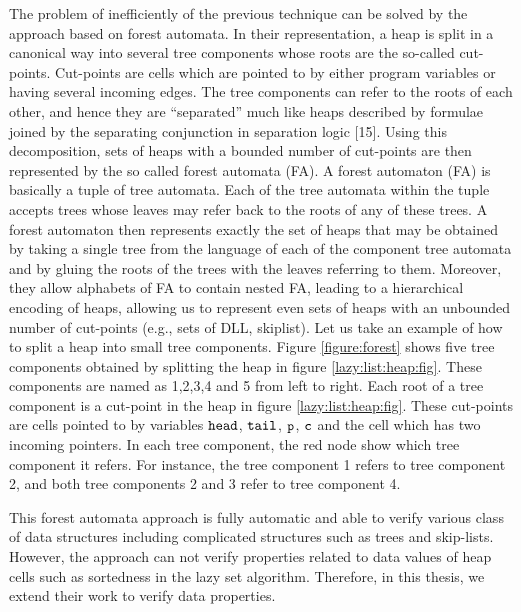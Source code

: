 The problem of inefficiently of the previous technique can be solved by the approach based on forest automata. In their representation, a heap is split in a canonical way into several tree components whose roots are the so-called cut-points. Cut-points are cells which are pointed to by either program variables or having several incoming edges. The tree components can refer to the roots of each other, and hence they are “separated” much like heaps described by formulae joined by the separating conjunction in separation logic [15]. Using this decomposition, sets of heaps with a bounded number of cut-points are then represented by the so called forest automata (FA). A forest automaton (FA) is basically a tuple of tree automata. Each of the tree
automata within the tuple accepts trees whose leaves may refer back to the
roots of any of these trees. A forest automaton then represents exactly the set
of heaps that may be obtained by taking a single tree from the language of each
of the component tree automata and by gluing the roots of the trees with the
leaves referring to them. Moreover, they allow alphabets of FA to contain nested FA, leading to a hierarchical encoding of heaps, allowing us to represent even sets of heaps with an unbounded number of cut-points (e.g., sets of DLL, skiplist). 
Let us take an example of how to split a heap into small tree components. Figure \ref{figure:forest} shows five tree components obtained by splitting the heap in figure \ref{lazy:list:heap:fig}. These components are named as 1,2,3,4 and 5 from left to right. Each root of a tree component is a cut-point in the heap in figure \ref{lazy:list:heap:fig}. These cut-points are cells pointed to by variables $\tt head$, $\tt tail$,  $\tt p$,  $\tt c$ and the cell which has two incoming pointers. In each tree component, the red node show which  tree component it refers. For instance, the tree component 1 refers to tree component 2, and both tree components 2 and 3 refer to tree component 4.

This forest automata approach is fully automatic and able to verify various class  of data structures including complicated structures such as trees and skip-lists. However, the approach can not verify properties related to data values of heap cells such as sortedness in the lazy set algorithm. Therefore, in this thesis, we extend their work to verify data properties. 

